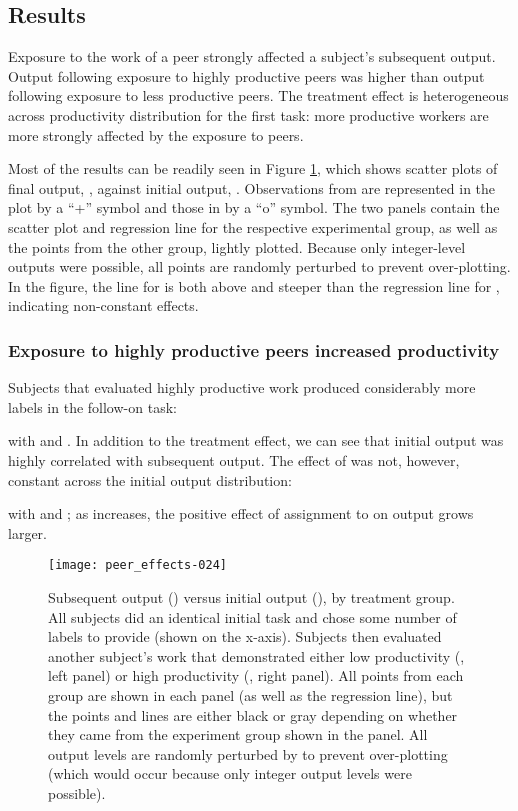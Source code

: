 \documentclass[12pt]{article}
\begin{document}
\subsection{Results} 
Exposure to the work of a peer strongly affected a subject's
subsequent output. Output following exposure to highly productive
peers was higher than output following exposure to less productive
peers.  The treatment effect is heterogeneous across productivity
distribution for the first task: more productive workers are more
strongly affected by the exposure to peers.

Most of the results can be readily seen in Figure
\ref{fig:ExpD.output}, which shows scatter plots of final output,
, against initial output, . Observations from  are
represented in the plot by a ``+'' symbol and those in  by a
``o'' symbol. The two panels contain the scatter plot and regression
line for the respective experimental group, as well as the points from
the other group, lightly plotted.  Because only integer-level outputs
were possible, all points are randomly perturbed to prevent
over-plotting. In the figure, the line for  is both above and
steeper than the regression line for , indicating non-constant
effects.


\subsubsection{Exposure to highly productive peers increased productivity}
Subjects that evaluated highly productive work produced considerably more
labels in the follow-on task: 

with  and . In
addition to the treatment effect, we can see that initial output was
highly correlated with subsequent output. The effect of  was
not, however, constant across the initial output distribution:
 
with  and ; as  increases, the
positive effect of assignment to  on output grows larger.

\begin{figure} 
\centering 
\texttt{[image: peer\_effects-024]}
\caption{Subsequent output () versus initial output (), by
  treatment group. All subjects did an identical initial task and
  chose some number of labels to provide (shown on the
  x-axis). Subjects then evaluated another subject's work that
  demonstrated either low productivity (, left panel) or high
  productivity (, right panel). All points from each group are
  shown in each panel (as well as the regression line), but the points
  and lines are either black or gray depending on whether they came
  from the experiment group shown in the panel. All output levels are
  randomly perturbed by  to prevent
  over-plotting (which would occur because only integer output levels
  were possible).
   \label{fig:ExpD.output}}
\end{figure} 
\end{document}
